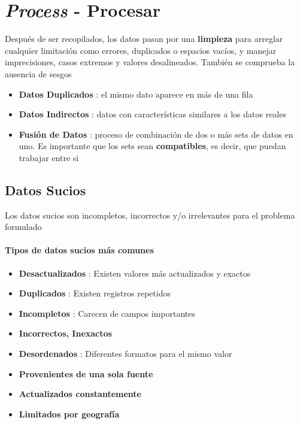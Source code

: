 

\section{\textit{Process} - Procesar}
Después de ser recopilados, los datos pasan por una \textbf{limpieza} para arreglar cualquier limitación como errores, duplicados o espacios vacíos, y manejar imprecisiones, casos extremos y valores desalineados. También se comprueba la ausencia de sesgos
\begin{itemize}
    \item {\textbf{Datos Duplicados} : el mismo dato aparece en más de una fila}
    \item {\textbf{Datos Indirectos} : datos con características similares a los datos reales}
    \item {\textbf{Fusión de Datos} : proceso de combinación de dos o más sets de datos en uno. Es importante que los sets sean \textbf{compatibles}, es decir, que puedan trabajar entre si}
\end{itemize}

\subsection{Datos Sucios}
Los datos sucios son incompletos, incorrectos y/o irrelevantes para el problema formulado
\paragraph{Tipos de datos sucios más comunes}
\begin{itemize}
    \item {\textbf{Desactualizados} : Existen valores más actualizados y exactos}
    \item {\textbf{Duplicados} : Existen registros repetidos}
    \item {\textbf{Incompletos} : Carecen de campos importantes}
    \item {\textbf{Incorrectos, Inexactos}}
    \item {\textbf{Desordenados} : Diferentes formatos para el mismo valor}
    \item {\textbf{Provenientes de una sola fuente}}
    \item {\textbf{Actualizados constantemente}}
    \item {\textbf{Limitados por geografía}}
\end{itemize}

